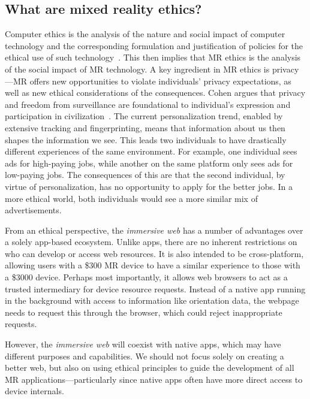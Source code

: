 \subsection{What are mixed reality ethics?}\label{sec:ethics}

Computer ethics is the analysis of the nature and social impact of computer technology and the corresponding formulation and justification of policies for the ethical use of such technology~\cite{moor1985computer}. This then implies that MR ethics is the analysis of the social impact of MR technology. A key ingredient in MR ethics is privacy---MR offers new opportunities to violate individuals' privacy expectations, as well as new ethical considerations of the consequences. Cohen argues that privacy and freedom from surveillance are foundational to individual's expression and participation in civilization~\cite{cohen2012privacy}. The current personalization trend, enabled by extensive tracking and fingerprinting, means that information about us then shapes the information we see. This leads two individuals to have drastically different experiences of the same environment. For example, one individual sees ads for high-paying jobs, while another on the same platform only sees ads for low-paying jobs. The consequences of this are that the second individual, by virtue of personalization, has no opportunity to apply for the better jobs. In a more ethical world, both individuals would see a more similar mix of advertisements.

From an ethical perspective, the \emph{immersive web} has a number of advantages over a solely app-based ecosystem. Unlike apps, there are no inherent restrictions on who can develop or access web resources. It is also intended to be cross-platform, allowing users with a \$300 MR device to have a similar experience to those with a \$3000 device. Perhaps most importantly, it allows web browsers to act as a trusted intermediary for device resource requests. Instead of a native app running in the background with access to information like orientation data, the webpage needs to request this through the browser, which could reject inappropriate requests.

However, the \emph{immersive web} will coexist with native apps, which may have different purposes and capabilities. We should not focus solely on creating a better web, but also on using ethical principles to guide the development of all MR applications---particularly since native apps often have more direct access to device internals.

